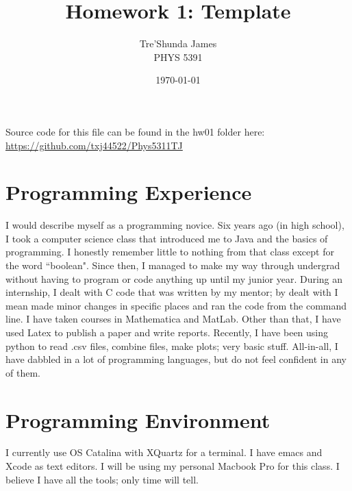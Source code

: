 \documentclass[12pt, letterpaper]{article} %
\begin{document}
\title{Homework 1: Template } %
\author{Tre'Shunda James\\PHYS 5391} %
\date{\today}%


\maketitle %
    \begin{center} %
    Source code for this file can be found in the hw01 folder here: \url{https://github.com/txj44522/Phys5311TJ}
    \end{center} %
\newpage %
\tableofcontents %
\newpage %


\section{Programming Experience} %
I would describe myself as a programming novice. Six years ago (in high school), I took a computer science class that introduced me to Java and the basics of programming. I honestly remember little to nothing from that class except for the word ``boolean". Since then, I managed to make my way through undergrad without having to program or code anything up until my junior year. During an internship, I dealt with C code that was written by my mentor; by dealt with I mean made minor changes in specific places and ran the code from the command line. I have taken courses in Mathematica and MatLab. Other than that, I have used Latex to publish a paper and write reports. Recently, I have been using python to read .csv files, combine files, make plots; very basic stuff. All-in-all, I have dabbled in a lot of programming languages, but do not feel confident in any of them. 
\section{Programming Environment}%
I currently use OS Catalina with XQuartz for a terminal. I have emacs and Xcode as text editors. I will be using my personal Macbook Pro for this class. I believe I have all the tools; only time will tell. 
\end{document}
